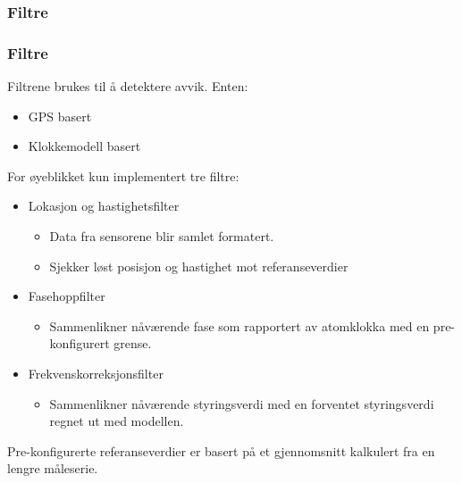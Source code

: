 \documentclass[xcolor=table]{beamer}
\begin{document}
\subsubsection{Filtre}
\begin{frame}
  \frametitle{Filtre}
  Filtrene brukes til å detektere avvik. Enten:
        \begin{itemize}
          \item GPS basert
          \item Klokkemodell basert
        \end{itemize}
  For øyeblikket kun implementert tre filtre:
  \begin{itemize}
    \item Lokasjon og hastighetsfilter
                  \begin{itemize}
                    \item Data fra sensorene blir samlet formatert.
                    \item Sjekker løst posisjon og hastighet mot referanseverdier
                  \end{itemize}
    \item Fasehoppfilter
                    \begin{itemize}
                      \item Sammenlikner nåværende fase som rapportert av atomklokka med en pre-konfigurert grense.
                    \end{itemize}
    \item Frekvenskorreksjonsfilter
                    \begin{itemize}
                      \item Sammenlikner nåværende styringsverdi med en forventet styringsverdi regnet ut med modellen.
                    \end{itemize}
  \end{itemize}
  Pre-konfigurerte referanseverdier er basert på et gjennomsnitt kalkulert fra en lengre måleserie.
\end{frame}
\end{document}
